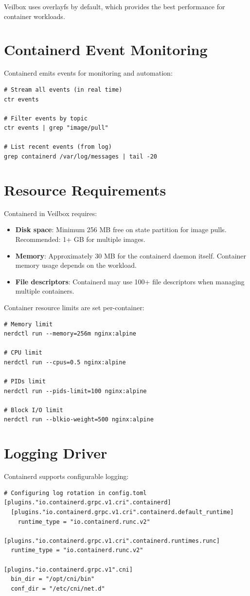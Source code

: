 Veilbox uses overlayfs by default, which provides the best performance
for container workloads.

\section{Containerd Event Monitoring}

Containerd emits events for monitoring and automation:

\begin{lstlisting}
# Stream all events (in real time)
ctr events

# Filter events by topic
ctr events | grep "image/pull"

# List recent events (from log)
grep containerd /var/log/messages | tail -20
\end{lstlisting}

\section{Resource Requirements}

Containerd in Veilbox requires:

\begin{itemize}[nosep]
  \item \textbf{Disk space}: Minimum 256 MB free on state partition for
        image pulls. Recommended: 1+ GB for multiple images.
  \item \textbf{Memory}: Approximately 30 MB for the containerd daemon
        itself. Container memory usage depends on the workload.
  \item \textbf{File descriptors}: Containerd may use 100+ file
        descriptors when managing multiple containers.
\end{itemize}

Container resource limits are set per-container:

\begin{lstlisting}
# Memory limit
nerdctl run --memory=256m nginx:alpine

# CPU limit
nerdctl run --cpus=0.5 nginx:alpine

# PIDs limit
nerdctl run --pids-limit=100 nginx:alpine

# Block I/O limit
nerdctl run --blkio-weight=500 nginx:alpine
\end{lstlisting}

\section{Logging Driver}

Containerd supports configurable logging:

\begin{lstlisting}
# Configuring log rotation in config.toml
[plugins."io.containerd.grpc.v1.cri".containerd]
  [plugins."io.containerd.grpc.v1.cri".containerd.default_runtime]
    runtime_type = "io.containerd.runc.v2"

[plugins."io.containerd.grpc.v1.cri".containerd.runtimes.runc]
  runtime_type = "io.containerd.runc.v2"

[plugins."io.containerd.grpc.v1".cni]
  bin_dir = "/opt/cni/bin"
  conf_dir = "/etc/cni/net.d"
\end{lstlisting}

